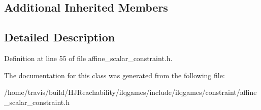 \subsection*{Additional Inherited Members}


\subsection{Detailed Description}


Definition at line 55 of file affine\+\_\+scalar\+\_\+constraint.\+h.



The documentation for this class was generated from the following file\+:\begin{DoxyCompactItemize}
\item 
/home/travis/build/\+H\+J\+Reachability/ilqgames/include/ilqgames/constraint/affine\+\_\+scalar\+\_\+constraint.\+h\end{DoxyCompactItemize}
